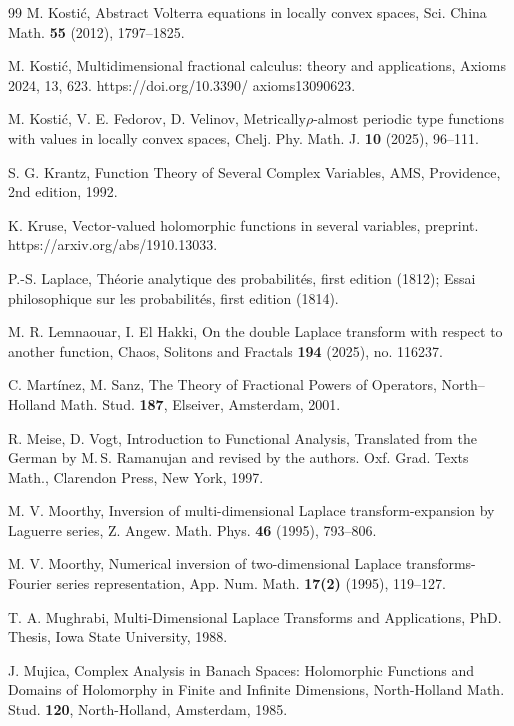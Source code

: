 \documentclass{amsart}
\theoremstyle{definition}
\theoremstyle{remark}
\numberwithin{equation}{section}
\begin{document}
\begin{thebibliography}{99}
M. Kosti\'c, Abstract Volterra equations in locally convex spaces, Sci. China Math. {\bf 55} (2012),
1797--1825.

M. Kosti\'c, 
Multidimensional
fractional calculus: theory and
applications,
Axioms 2024, 13, 623.
https://doi.org/10.3390/
axioms13090623.

M. Kosti\'c, V. E. Fedorov, D. Velinov,
Metrically$\rho$-almost periodic type functions with values in locally convex spaces,
Chelj. Phy. Math. J. {\bf 10} (2025), 96--111.

S. G. Krantz,
Function Theory of Several Complex Variables,
 AMS, Providence,
2nd edition, 1992.

K. Kruse,
Vector-valued holomorphic functions in several variables,
preprint. https://arxiv.org/abs/1910.13033.

P.-S. Laplace, 
Th\'eorie analytique des probabilit\'es, first edition (1812); 
Essai philosophique sur les probabilit\'es, first edition (1814).

M. R. Lemnaouar, I. El Hakki,
On the double Laplace transform with respect to another function,
Chaos, Solitons and Fractals {\bf 194} (2025), no. 116237.

C. Mart\'inez, M. Sanz,
The Theory of Fractional Powers of Operators, 
North--Holland Math. Stud. \textbf{187}, Elseiver,
Amsterdam, 2001.

R. Meise, D. Vogt,
Introduction to Functional Analysis,
Translated from the German by M.\,S. Ramanujan and revised by the authors.
Oxf. Grad. Texts Math., Clarendon Press, New York, 1997.

 M. V.
Moorthy, 
Inversion of multi-dimensional Laplace transform-expansion by Laguerre series, Z.
Angew. Math. Phys. {\bf 46} (1995), 793--806. 

 M. V.
Moorthy, 
Numerical inversion of two-dimensional Laplace transforms-Fourier series representation,
App. Num. Math. {\bf 17(2)} (1995), 119--127. 

T. A. Mughrabi,
Multi-Dimensional Laplace Transforms and Applications,
PhD. Thesis, Iowa State University, 1988. 

J. Mujica, 
Complex Analysis in Banach Spaces: Holomorphic Functions and Domains of Holomorphy in Finite and Infinite Dimensions, 
North-Holland Math.
Stud. {\bf 120}, North-Holland, Amsterdam, 1985.


\end{thebibliography}
\end{document}
